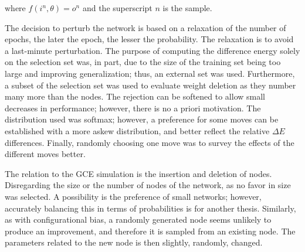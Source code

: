 where $f(i^n, \theta)= o^n$ and the superscript $n$ is the sample.

The decision to perturb the network is based on a relaxation of the number of epochs, the later the epoch, the lesser the probability. The relaxation is to avoid a last-minute perturbation. The purpose of computing the difference energy solely on the selection set was, in part, due to the size of the training set being too large and improving generalization; thus, an external set was used. Furthermore, a subset of the selection set was used to evaluate weight deletion as they number many more than the nodes. The rejection can be softened to allow small decreases in performance; however, there is no a priori motivation. The distribution used was softmax; however, a preference for some moves can be established with a more askew distribution, and better reflect the relative $\Delta E$ differences. Finally, randomly choosing one move was to survey the effects of the different moves better.  

The relation to the GCE simulation is the insertion and deletion of nodes. Disregarding the size or the number of nodes of the network, as no favor in size was selected. A possibility is the preference of small networks; however, accurately balancing this in terms of probabilities is for another thesis. Similarly, as with configurational bias, a randomly generated node seems unlikely to produce an improvement, and therefore it is sampled from an existing node. The parameters related to the new node is then slightly, randomly, changed. 